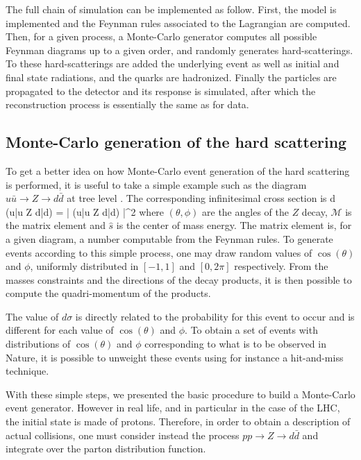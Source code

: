     The full chain of simulation can be implemented as follow. First, the model
    is implemented and the Feynman rules associated to the Lagrangian are computed.
    Then, for a given process, a Monte-Carlo generator computes all possible
    Feynman diagrams up to a given order, and randomly generates hard-scatterings.
    To these hard-scatterings are added the underlying event as well as initial and
    final state radiations, and the quarks are hadronized. Finally the particles
    are propagated to the detector and its response is simulated, after which
    the reconstruction process is essentially the same as for data.

    \subsection{Monte-Carlo generation of the hard scattering}

    To get a better idea on how Monte-Carlo event generation of the hard scattering
    is performed, it is useful to take a simple example such as the diagram
    $u\bar{u} \rightarrow Z \rightarrow d\bar{d}$ at tree level \cite{MCGenLesHouches}. The corresponding
    infinitesimal cross section is
    {
        d \sigma(u\bar{u} \rightarrow Z \rightarrow d\bar{d})
        =
        \left|
            (u\bar{u} \rightarrow Z \rightarrow d\bar{d})
        \right|^2
    }
    where $(\theta,\phi)$ are the angles of the $Z$ decay, $\mathcal{M}$
    is the matrix element and $\hat{s}$ is the center of mass energy. The matrix
    element is, for a given diagram, a number computable from the Feynman rules.
    To generate events according to this simple process, one may draw random
    values of $\cos(\theta)$ and $\phi$, uniformly distributed in $[-1, 1]$ and
    $[0,2\pi]$ respectively. From the masses constraints and the directions of the
    decay products, it is then possible to compute the quadri-momentum of the products.

    The value of $d\sigma$ is directly related to the probability for this event
    to occur and is different for each value of $\cos(\theta)$ and $\phi$. To obtain
    a set of events with distributions of $\cos(\theta)$ and $\phi$ corresponding to
    what is to be observed in Nature, it is possible to unweight these events using
    for instance a hit-and-miss technique.

    With these simple steps, we presented the basic procedure to build a Monte-Carlo
    event generator. However in real life, and in particular in the case of the
    LHC, the initial state is made of protons. Therefore, in order to obtain a
    description of actual collisions, one must consider instead the process
    $pp \rightarrow Z \rightarrow d\bar{d}$ and integrate over the parton distribution
    function.

